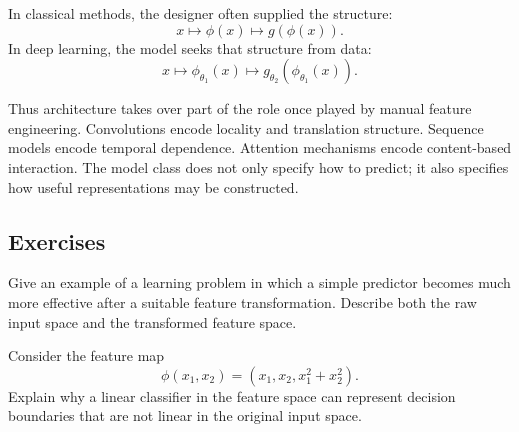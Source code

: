 In classical methods, the designer often supplied the structure:
\[
x \longmapsto \phi(x) \longmapsto g(\phi(x)).
\]
In deep learning, the model seeks that structure from data:
\[
x \longmapsto \phi_{\theta_1}(x) \longmapsto g_{\theta_2}(\phi_{\theta_1}(x)).
\]

Thus architecture takes over part of the role once played by manual feature engineering. Convolutions encode locality and translation structure. Sequence models encode temporal dependence. Attention mechanisms encode content-based interaction. The model class does not only specify how to predict; it also specifies how useful representations may be constructed.



\subsection*{Exercises}

\begin{exercise}
Give an example of a learning problem in which a simple predictor becomes much more effective after a suitable feature transformation. Describe both the raw input space and the transformed feature space.
\end{exercise}

\begin{exercise}
Consider the feature map
\[
\phi(x_1,x_2)=(x_1,x_2,x_1^2+x_2^2).
\]
Explain why a linear classifier in the feature space can represent decision boundaries that are not linear in the original input space.
\end{exercise}

